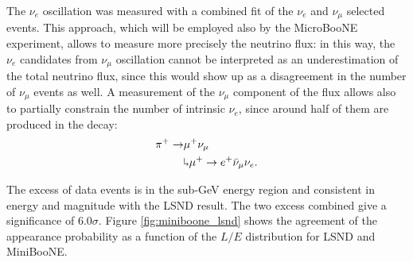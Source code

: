 The $\nu_{e}$ oscillation was measured with a combined fit of the $\nu_{e}$ and $\nu_{\mu}$ selected events. This approach, which will be employed also by the MicroBooNE experiment, allows to measure more precisely the neutrino flux: in this way, the $\nu_e$ candidates from $\nu_{\mu}$ oscillation cannot be interpreted as an underestimation of the total neutrino flux, since this would show up as a disagreement in the number of $\nu_{\mu}$ events as well. A measurement of the $\nu_{\mu}$ component of the flux allows also to partially constrain the number of intrinsic $\nu_e$, since around half of them are produced in the decay:
\begin{align}
    \pi^+ \rightarrow & \mu^+\nu_{\mu}\\
    & \rotatebox[origin=c]{180}{$\Lsh$}	 \mu^{+} \rightarrow e^+\bar{\nu}_{\mu}\nu_{e}.
\end{align}

The excess of data events is in the sub-GeV energy region and consistent in energy and magnitude with the LSND result. The two excess combined give a significance of $6.0\sigma$. Figure \ref{fig:miniboone_lsnd} shows the agreement of the appearance probability as a function of the $L/E$ distribution for LSND and MiniBooNE. 

